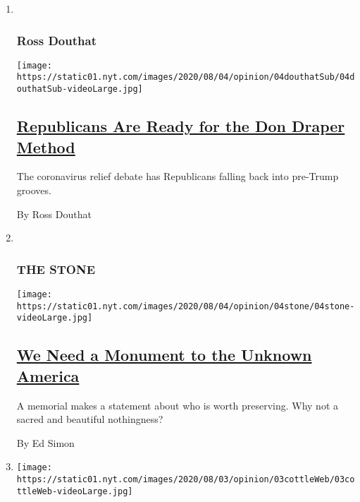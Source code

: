 \begin{enumerate}
\def\labelenumi{\arabic{enumi}.}
\item ~
  \hypertarget{ross-douthat}{%
  \subsubsection{Ross Douthat}\label{ross-douthat}}

  \texttt{[image: https://static01.nyt.com/images/2020/08/04/opinion/04douthatSub/04douthatSub-videoLarge.jpg]}

  \hypertarget{republicans-are-ready-for-the-don-draper-method}{%
  \subsection{\texorpdfstring{\href{/2020/08/04/opinion/trump-republicans-tea-party.html}{Republicans
  Are Ready for the Don Draper
  Method}}{Republicans Are Ready for the Don Draper Method}}\label{republicans-are-ready-for-the-don-draper-method}}

  The coronavirus relief debate has Republicans falling back into
  pre-Trump grooves.

  By Ross Douthat
\item ~
  \hypertarget{the-stone}{%
  \subsubsection{THE STONE}\label{the-stone}}

  \texttt{[image: https://static01.nyt.com/images/2020/08/04/opinion/04stone/04stone-videoLarge.jpg]}

  \hypertarget{we-need-a-monument-to-the-unknown-america}{%
  \subsection{\texorpdfstring{\href{/2020/08/04/opinion/us-monuments-rome-unknown-god.html}{We
  Need a Monument to the Unknown
  America}}{We Need a Monument to the Unknown America}}\label{we-need-a-monument-to-the-unknown-america}}

  A memorial makes a statement about who is worth preserving. Why not a
  sacred and beautiful nothingness?

  By Ed Simon
\item
  \texttt{[image: https://static01.nyt.com/images/2020/08/03/opinion/03cottleWeb/03cottleWeb-videoLarge.jpg]}

  \hypertarget{disenchanted-seniors-for-biden}{%
}
\end{enumerate}
